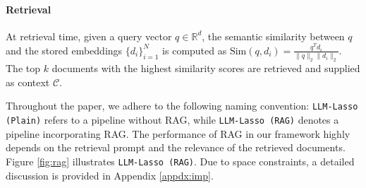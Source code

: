 \paragraph{Retrieval} 

At retrieval time, given a query vector $q \in \mathbb{R}^d$, the semantic similarity between $q$ and the stored embeddings $\{d_i\}_{i=1}^N$ is computed as $\text{Sim}(q,d_i) = \frac{q^T d_i}{\|q\|_2\|d_i\|_2}.$
The top $k$ documents with the highest similarity scores are retrieved and supplied as context $\mathcal{C}$.

Throughout the paper, we adhere to the following naming convention: \texttt{LLM-Lasso (Plain)} refers to a pipeline without RAG, while \texttt{LLM-Lasso (RAG)} denotes a pipeline incorporating RAG.
The performance of RAG in our framework highly depends on the retrieval prompt and the relevance of the retrieved documents. 
Figure \ref{fig:rag} illustrates \texttt{LLM-Lasso (RAG)}.
Due to space constraints, a detailed discussion is provided in Appendix \ref{appdx:imp}.




